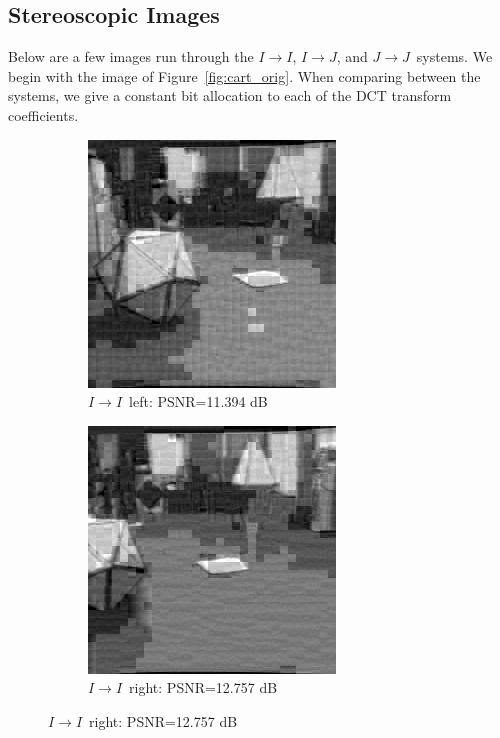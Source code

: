 \documentclass[10pt,twoside,titlepage]{article}
\newcommand{\sysII}{\mbox{$I \rightarrow I$}}
\newcommand{\sysIJ}{\mbox{$I \rightarrow J$}}
\newcommand{\sysJJ}{\mbox{$J \rightarrow J$}}
\begin{document}
\clearpage
\subsection{Stereoscopic Images}

Below are a few images run through the \sysII, \sysIJ, and \sysJJ\ systems. We begin with the image of Figure~\ref{fig:cart_orig}. When comparing between the systems, we give a constant bit allocation to each of the DCT transform coefficients.

\begin{figure}
    \centering
    \begin{subfigure}{0.5\textwidth}
        \centering
        \includegraphics[width=0.6\linewidth]{img/cart_ii_left.png}
        \caption{\sysII\ left: PSNR=11.394 dB}
    \end{subfigure}%
    \begin{subfigure}{0.5\textwidth}
        \centering
        \includegraphics[width=0.6\linewidth]{img/cart_ii_right.png}
        \caption{\sysII\ right: PSNR=12.757 dB}
    \end{subfigure}
    \label{fig:cart_ii}


\end{figure}
\end{document}
